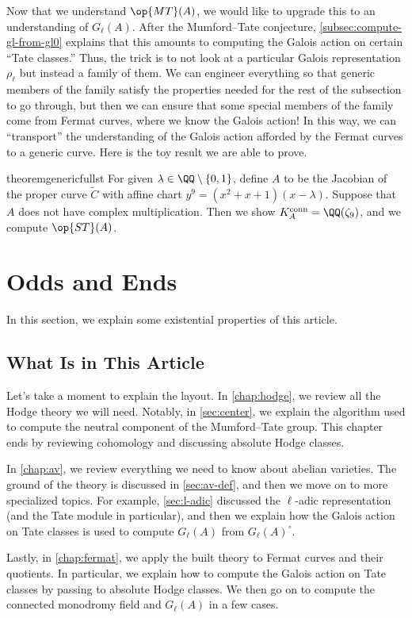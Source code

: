 \documentclass[openany]{book}
\begin{document}
Now that we understand $\op{MT}(A)$, we would like to upgrade this to an understanding of $G_\ell(A)$. After the Mumford--Tate conjecture, \cref{subsec:compute-gl-from-gl0} explains that this amounts to computing the Galois action on certain ``Tate classes.'' Thus, the trick is to not look at a particular Galois representation $\rho_\ell$ but instead a family of them. We can engineer everything so that generic members of the family satisfy the properties needed for the rest of the subsection to go through, but then we can ensure that some special members of the family come from Fermat curves, where we know the Galois action! In this way, we can ``transport'' the understanding of the Galois action afforded by the Fermat curves to a generic curve. Here is the toy result we are able to prove.
\begin{restatable*}{theorem}{genericfullst}
	For given $\lambda\in\QQ\setminus\{0,1\}$, define $A$ to be the Jacobian of the proper curve $\widetilde C$ with affine chart $y^9=\left(x^2+x+1\right)(x-\lambda)$. Suppose that $A$ does not have complex multiplication. Then we show $K_A^{\mathrm{conn}}=\QQ(\zeta_9)$, and we compute $\op{ST}(A)$.
\end{restatable*}

\section{Odds and Ends}
In this section, we explain some existential properties of this article.

\subsection{What Is in This Article}
Let's take a moment to explain the layout. In \cref{chap:hodge}, we review all the Hodge theory we will need. Notably, in \cref{sec:center}, we explain the algorithm used to compute the neutral component of the Mumford--Tate group. This chapter ends by reviewing cohomology and discussing absolute Hodge classes.

In \cref{chap:av}, we review everything we need to know about abelian varieties. The ground of the theory is discussed in \cref{sec:av-def}, and then we move on to more specialized topics. For example, \cref{sec:l-adic} discussed the $\ell$-adic representation (and the Tate module in particular), and then we explain how the Galois action on Tate classes is used to compute $G_\ell(A)$ from $G_\ell(A)^\circ$.

Lastly, in \cref{chap:fermat}, we apply the built theory to Fermat curves and their quotients. In particular, we explain how to compute the Galois action on Tate classes by passing to absolute Hodge classes. We then go on to compute the connected monodromy field and $G_\ell(A)$ in a few cases.
\end{document}

